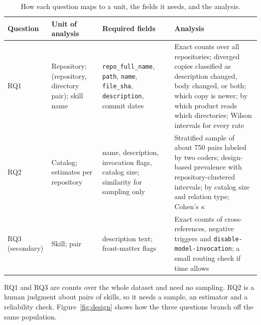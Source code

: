 \documentclass[11pt]{article}
\begin{document}
\begin{table}[h]
\centering\small
\begin{tabularx}{\textwidth}{p{2.1cm}p{2.9cm}YY}
\toprule
Question & Unit of analysis & Required fields & Analysis \\
\midrule
RQ1 & Repository; (repository, directory pair); skill name & \texttt{repo\_full\_name}, \texttt{path}, \texttt{name},
  \texttt{file\_sha}, \texttt{description}, commit dates & Exact counts over all repositories; diverged copies classified as
  description changed, body changed, or both; which copy is newer; by which product reads which directories; Wilson
  intervals for every rate \\
\addlinespace
RQ2 & Catalog; estimates per repository & name, description, invocation flags, catalog size; similarity for sampling only &
  Stratified sample of about 750 pairs labeled by two coders; design-based prevalence with repository-clustered intervals;
  by catalog size and relation type; Cohen's $\kappa$ \\
\addlinespace
RQ3 (secondary) & Skill; pair & description text; front-matter flags & Exact counts of cross-references, negative triggers
  and \texttt{disable-model-invocation}; a small routing check if time allows \\
\bottomrule
\end{tabularx}
\caption{How each question maps to a unit, the fields it needs, and the analysis.}
\end{table}

RQ1 and RQ3 are counts over the whole dataset and need no sampling. RQ2 is a human judgment about pairs of skills, so it
needs a sample, an estimator and a reliability check. Figure~\ref{fig:design} shows how the three questions branch off the
same population.
\end{document}
